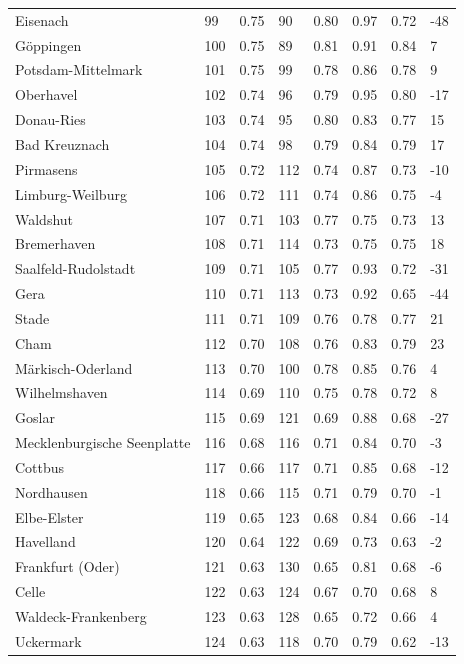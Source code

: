 \documentclass[11pt,a4paper]{article}
\begin{document}
{\begin{longtable}{llllllll}
Eisenach & 99 & 0.75 & 90 & 0.80 & 0.97 & 0.72 & -48 \\
Göppingen & 100 & 0.75 & 89 & 0.81 & 0.91 & 0.84 & 7 \\
Potsdam-Mittelmark & 101 & 0.75 & 99 & 0.78 & 0.86 & 0.78 & 9 \\
Oberhavel & 102 & 0.74 & 96 & 0.79 & 0.95 & 0.80 & -17 \\
Donau-Ries & 103 & 0.74 & 95 & 0.80 & 0.83 & 0.77 & 15 \\
Bad Kreuznach & 104 & 0.74 & 98 & 0.79 & 0.84 & 0.79 & 17 \\
Pirmasens & 105 & 0.72 & 112 & 0.74 & 0.87 & 0.73 & -10 \\
Limburg-Weilburg & 106 & 0.72 & 111 & 0.74 & 0.86 & 0.75 & -4 \\
Waldshut & 107 & 0.71 & 103 & 0.77 & 0.75 & 0.73 & 13 \\
Bremerhaven & 108 & 0.71 & 114 & 0.73 & 0.75 & 0.75 & 18 \\
Saalfeld-Rudolstadt & 109 & 0.71 & 105 & 0.77 & 0.93 & 0.72 & -31 \\
Gera & 110 & 0.71 & 113 & 0.73 & 0.92 & 0.65 & -44 \\
Stade & 111 & 0.71 & 109 & 0.76 & 0.78 & 0.77 & 21 \\
Cham & 112 & 0.70 & 108 & 0.76 & 0.83 & 0.79 & 23 \\
Märkisch-Oderland & 113 & 0.70 & 100 & 0.78 & 0.85 & 0.76 & 4 \\
Wilhelmshaven & 114 & 0.69 & 110 & 0.75 & 0.78 & 0.72 & 8 \\
Goslar & 115 & 0.69 & 121 & 0.69 & 0.88 & 0.68 & -27 \\
Mecklenburgische Seenplatte & 116 & 0.68 & 116 & 0.71 & 0.84 & 0.70 & -3 \\
Cottbus & 117 & 0.66 & 117 & 0.71 & 0.85 & 0.68 & -12 \\
Nordhausen & 118 & 0.66 & 115 & 0.71 & 0.79 & 0.70 & -1 \\
Elbe-Elster & 119 & 0.65 & 123 & 0.68 & 0.84 & 0.66 & -14 \\
Havelland & 120 & 0.64 & 122 & 0.69 & 0.73 & 0.63 & -2 \\
Frankfurt (Oder) & 121 & 0.63 & 130 & 0.65 & 0.81 & 0.68 & -6 \\
Celle & 122 & 0.63 & 124 & 0.67 & 0.70 & 0.68 & 8 \\
Waldeck-Frankenberg & 123 & 0.63 & 128 & 0.65 & 0.72 & 0.66 & 4 \\
Uckermark & 124 & 0.63 & 118 & 0.70 & 0.79 & 0.62 & -13 \\

\end{longtable}}
\end{document}
